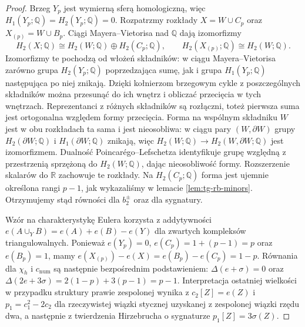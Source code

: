 \begin{proof}
Brzeg $Y_p$ jest wymierną sferą homologiczną,
więc $H_1(Y_p;\mathbb Q)=H_2(Y_p;\mathbb Q)=0$.
Rozpatrzmy rozkłady $X=W\cup C_p$ oraz
$X_{(p)}=W\cup B_p$. Ciągi Mayera--Vietorisa
nad $\mathbb Q$ dają izomorfizmy
\[
H_2(X;\mathbb Q)\cong H_2(W;\mathbb Q)
\oplus H_2(C_p;\mathbb Q),\qquad
H_2(X_{(p)};\mathbb Q)\cong H_2(W;\mathbb Q).
\]
Izomorfizmy te pochodzą od włożeń składników:
w ciągu Mayera--Vietorisa zarówno grupa
$H_2(Y_p;\mathbb Q)$ poprzedzająca sumę,
jak i grupa $H_1(Y_p;\mathbb Q)$ następująca
po niej znikają. Dzięki kołnierzom brzegowym
cykle z poszczególnych składników można przesunąć
do ich wnętrz i obliczać przecięcia w tych wnętrzach.
Reprezentanci z różnych składników są rozłączni,
toteż pierwsza suma jest ortogonalna względem
formy przecięcia. Forma na wspólnym składniku $W$
jest w obu rozkładach ta sama i jest nieosobliwa:
w ciągu pary $(W,\partial W)$ grupy
$H_2(\partial W;\mathbb Q)$ i
$H_1(\partial W;\mathbb Q)$ znikają, więc
$H_2(W;\mathbb Q)\to H_2(W,\partial W;\mathbb Q)$
jest izomorfizmem. Dualność Poincarégo--Lefschetza
identyfikuje grupę względną z przestrzenią
sprzężoną do $H_2(W;\mathbb Q)$, dając
nieosobliwość formy. Rozszerzenie skalarów
do $\mathbb R$ zachowuje te rozkłady.
Na $H_2(C_p;\mathbb Q)$ forma jest ujemnie określona
rangi $p-1$, jak wykazaliśmy w lemacie
\ref{lem:tg-rb-minors}. Otrzymujemy stąd równości
dla $b_2^\pm$ oraz dla sygnatury.

Wzór na charakterystykę Eulera korzysta z addytywności
$e(A\cup_YB)=e(A)+e(B)-e(Y)$ dla zwartych
kompleksów triangulowalnych. Ponieważ
$e(Y_p)=0$, $e(C_p)=1+(p-1)=p$ oraz
$e(B_p)=1$, mamy
$e(X_{(p)})-e(X)=e(B_p)-e(C_p)=1-p$.
Równania dla $\chi_h$ i $c_{\mathrm{num}}$ są
następnie bezpośrednim podstawieniem:
$\Delta(e+\sigma)=0$ oraz
$\Delta(2e+3\sigma)=2(1-p)+3(p-1)=p-1$.
Interpretacja ostatniej wielkości w przypadku
struktury prawie zespolonej wynika z
$c_2[Z]=e(Z)$ i $p_1=c_1^2-2c_2$
dla rzeczywistej wiązki stycznej uzyskanej
z zespolonej wiązki rzędu dwa, a następnie
z twierdzenia Hirzebrucha o sygnaturze
$p_1[Z]=3\sigma(Z)$.
\end{proof}


